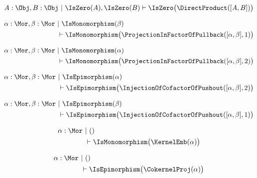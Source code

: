 \begin{sequent}
\begin{align*}
  A:\Obj, B:\Obj ~|~ \IsZero(A), \IsZero(B) \vdash \IsZero\big( \DirectProduct( [ A, B ] ) \big)
\end{align*}
\end{sequent}

\begin{sequent}
\begin{align*}
  \alpha:\Mor, \beta:\Mor  ~&|~ \IsMonomorphism( \beta ) \\
  &\vdash \IsMonomorphism\big( \ProjectionInFactorOfPullback( [\alpha, \beta], 1 ) \big)
\end{align*}
\end{sequent}

\begin{sequent}
\begin{align*}
  \alpha:\Mor, \beta:\Mor ~&|~ \IsMonomorphism( \alpha ) \\
  &\vdash \IsMonomorphism\big( \ProjectionInFactorOfPullback( [\alpha, \beta], 2 ) \big)
\end{align*}
\end{sequent}

\begin{sequent}
\begin{align*}
  \alpha:\Mor, \beta:\Mor ~&|~ \IsEpimorphism( \alpha ) \\
  &\vdash \IsEpimorphism\big( \InjectionOfCofactorOfPushout( [\alpha, \beta], 2 ) \big)
\end{align*}
\end{sequent}

\begin{sequent}
\begin{align*}
  \alpha:\Mor, \beta:\Mor  ~&|~ \IsEpimorphism( \beta ) \\
  &\vdash \IsEpimorphism\big( \InjectionOfCofactorOfPushout( [\alpha, \beta], 1 ) \big)
\end{align*}
\end{sequent}

\begin{sequent}
\begin{align*}
  \alpha:\Mor ~&|~ () \\
  &\vdash \IsMonomorphism\big( \KernelEmb( \alpha ) \big)
\end{align*}
\end{sequent}

\begin{sequent}
\begin{align*}
  \alpha:\Mor ~&|~ () \\
  &\vdash \IsEpimorphism\big( \CokernelProj( \alpha ) \big)
\end{align*}
\end{sequent}

